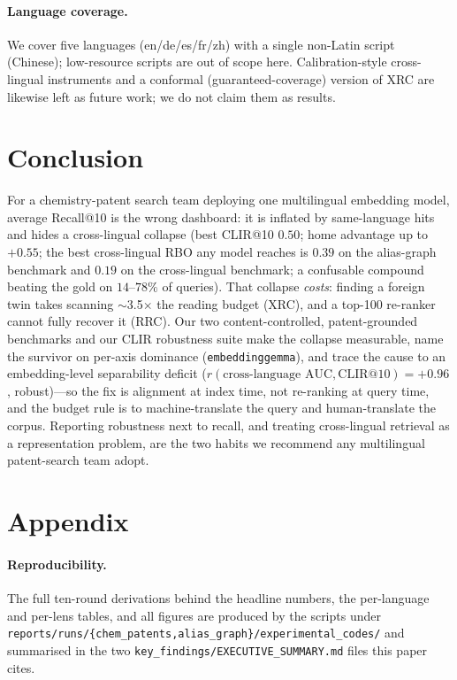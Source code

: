 \documentclass[11pt]{article}
\begin{document}
\paragraph{Language coverage.}
We cover five languages (en/de/es/fr/zh) with a single non-Latin script
(Chinese); low-resource scripts are out of scope here. Calibration-style
cross-lingual instruments and a conformal (guaranteed-coverage) version of XRC
are likewise left as future work; we do not claim them as results.

\section{Conclusion}

For a chemistry-patent search team deploying one multilingual embedding model,
average Recall@10 is the wrong dashboard: it is inflated by same-language hits
and hides a cross-lingual collapse (best CLIR@10 $0.50$; home advantage up to
$+0.55$; the best cross-lingual RBO any model reaches is $0.39$ on the
alias-graph benchmark and $0.19$ on the cross-lingual benchmark; a confusable
compound beating the gold on $14$--$78\%$ of queries). That collapse \emph{costs}:
finding a foreign twin takes scanning $\sim$3.5$\times$ the reading budget (XRC),
and a top-100 re-ranker cannot fully recover it (RRC). Our two content-controlled,
patent-grounded benchmarks and our CLIR robustness suite make the collapse
measurable, name the survivor on per-axis dominance (\texttt{embeddinggemma}),
and trace the cause to an embedding-level separability deficit
($r(\text{cross-language AUC},\text{CLIR@10})=+0.96$, robust)---so the fix is
alignment at index time, not re-ranking at query time, and the budget rule is to
machine-translate the query and human-translate the corpus. Reporting robustness
next to recall, and treating cross-lingual retrieval as a representation problem,
are the two habits we recommend any multilingual patent-search team adopt.



\appendix
\section{Appendix}

\paragraph{Reproducibility.}
The full ten-round derivations behind the headline numbers, the per-language and
per-lens tables, and all figures are produced by the scripts under
\texttt{reports/runs/\{chem\_patents,alias\_graph\}/experimental\_codes/} and
summarised in the two \texttt{key\_findings/EXECUTIVE\_SUMMARY.md} files this
paper cites.
\end{document}
